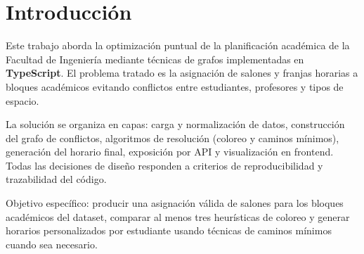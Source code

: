 \chapter{Introducción}

Este trabajo aborda la optimización puntual de la planificación académica de la Facultad de Ingeniería mediante técnicas de grafos implementadas en \textbf{TypeScript}. El problema tratado es la asignación de salones y franjas horarias a bloques académicos evitando conflictos entre estudiantes, profesores y tipos de espacio.

La solución se organiza en capas: carga y normalización de datos, construcción del grafo de conflictos, algoritmos de resolución (coloreo y caminos mínimos), generación del horario final, exposición por API y visualización en frontend. Todas las decisiones de diseño responden a criterios de reproducibilidad y trazabilidad del código.

Objetivo específico: producir una asignación válida de salones para los bloques académicos del dataset, comparar al menos tres heurísticas de coloreo y generar horarios personalizados por estudiante usando técnicas de caminos mínimos cuando sea necesario.

